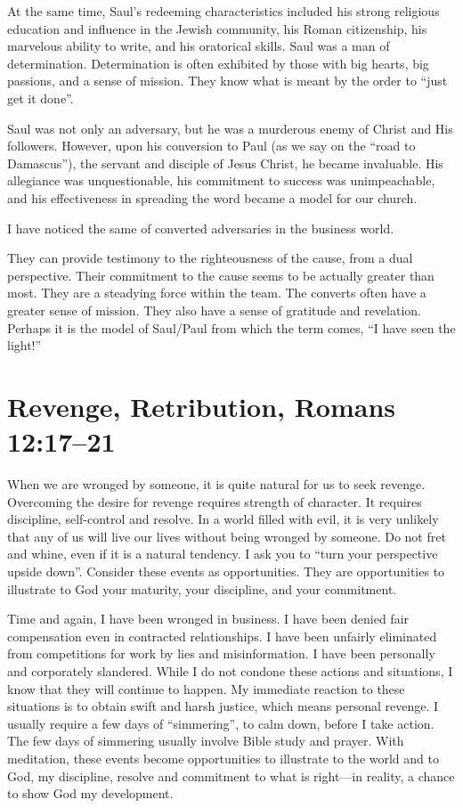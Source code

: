 \documentclass[12pt]{memoir}
\begin{document}
At the same time, Saul's redeeming characteristics included his strong
religious education and influence in the Jewish community, his Roman
citizenship, his marvelous ability to write, and his oratorical skills.
Saul was a man of determination. Determination is often exhibited
by those with big hearts, big passions, and a sense of mission. They
know what is meant by the order to ``just get it done''. 

Saul was not only an adversary, but he was a murderous enemy of Christ
and His followers.
However, upon his conversion to Paul (as we say
on the ``road to Damascus''), the servant and disciple of Jesus
Christ, he became invaluable. His allegiance was unquestionable, his
commitment to success was unimpeachable, and his effectiveness in
spreading the word became a model for our church.

I have noticed the same of converted adversaries in the business world. 

They can provide testimony to the righteousness of the cause, from
a dual perspective. Their commitment to the cause seems to be actually
greater than most. They are a steadying force within the team. The
converts often have a greater sense of mission. They also have a sense
of gratitude and revelation.
Perhaps it is the model of Saul\slash{}Paul from which the term comes, ``I have seen the light!''

\section{Revenge, Retribution, Romans 12:17--21}

When we are wronged by someone, it is quite natural for us to seek
revenge. Overcoming the desire for revenge requires strength of character.
It requires discipline, self-control and resolve. In a world filled
with evil, it is very unlikely that any of us will live our lives
without being wronged by someone. Do not fret and whine, even if it
is a natural tendency. I ask you to ``turn your perspective upside
down''. Consider these events as opportunities. They are opportunities
to illustrate to God your maturity, your discipline, and your commitment. 

Time and again, I have been wronged in business. I have been denied
fair compensation even in contracted relationships. I have been unfairly
eliminated from competitions for work by lies and misinformation.
I have been personally and corporately slandered. While I do not condone
these actions and situations, I know that they will continue to happen.
My immediate reaction to these situations is to obtain swift and harsh justice, which means personal revenge. I usually require a few days
of ``simmering'', to calm down, before I take action. The few days
of simmering usually involve Bible study and prayer. With meditation,
these events become opportunities to illustrate to the world and to
God, my discipline, resolve and commitment to what is right---in
reality, a chance to show God my development. 
\end{document}
